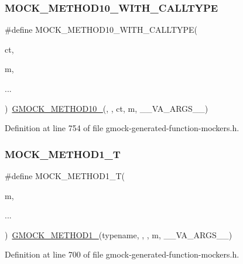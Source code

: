 \subsubsection{\texorpdfstring{M\+O\+C\+K\+\_\+\+M\+E\+T\+H\+O\+D10\+\_\+\+W\+I\+T\+H\+\_\+\+C\+A\+L\+L\+T\+Y\+PE}{MOCK\_METHOD10\_WITH\_CALLTYPE}}
{\footnotesize\ttfamily \#define M\+O\+C\+K\+\_\+\+M\+E\+T\+H\+O\+D10\+\_\+\+W\+I\+T\+H\+\_\+\+C\+A\+L\+L\+T\+Y\+PE(\begin{DoxyParamCaption}\item[{}]{ct,  }\item[{}]{m,  }\item[{}]{... }\end{DoxyParamCaption})~\hyperlink{gmock-generated-function-mockers_8h_a81a48223a8771de36ef92ac6d56f6e81}{G\+M\+O\+C\+K\+\_\+\+M\+E\+T\+H\+O\+D10\+\_\+}(, , ct, m, \+\_\+\+\_\+\+V\+A\+\_\+\+A\+R\+G\+S\+\_\+\+\_\+)}



Definition at line 754 of file gmock-\/generated-\/function-\/mockers.\+h.

\mbox{\label{gmock-generated-function-mockers_8h_a8e5b9539726be5c7a13f1aa3bcc1f29f}} 
\subsubsection{\texorpdfstring{M\+O\+C\+K\+\_\+\+M\+E\+T\+H\+O\+D1\+\_\+T}{MOCK\_METHOD1\_T}}
{\footnotesize\ttfamily \#define M\+O\+C\+K\+\_\+\+M\+E\+T\+H\+O\+D1\+\_\+T(\begin{DoxyParamCaption}\item[{}]{m,  }\item[{}]{... }\end{DoxyParamCaption})~\hyperlink{gmock-generated-function-mockers_8h_a1bc0012d62440dda77208dabdf4925c9}{G\+M\+O\+C\+K\+\_\+\+M\+E\+T\+H\+O\+D1\+\_\+}(typename, , , m, \+\_\+\+\_\+\+V\+A\+\_\+\+A\+R\+G\+S\+\_\+\+\_\+)}



Definition at line 700 of file gmock-\/generated-\/function-\/mockers.\+h.



